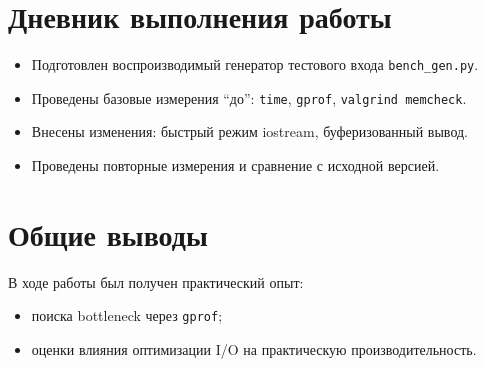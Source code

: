 \section{Дневник выполнения работы}
\begin{itemize}
    \item Подготовлен воспроизводимый генератор тестового входа \texttt{bench\_gen.py}.
    \item Проведены базовые измерения \enquote{до}: \texttt{time}, \texttt{gprof}, \texttt{valgrind memcheck}.
    \item Внесены изменения: быстрый режим iostream, буферизованный вывод.
    \item Проведены повторные измерения и сравнение с исходной версией.
\end{itemize}

\section{Общие выводы}
В ходе работы был получен практический опыт:
\begin{itemize}
    \item поиска bottleneck через \texttt{gprof};
    \item оценки влияния оптимизации I/O на практическую производительность.
\end{itemize}
\pagebreak
